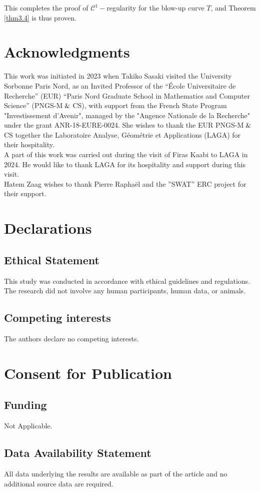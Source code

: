 \documentclass[
  sn-mathphys-num,
  colorlinks,
  linkcolor=darkmagenta,
  citecolor=rufous,
  urlcolor=zaffre,
  hypertexnames=false
]{sn-jnl}
\numberwithin{equation}{section}
\begin{document}
This completes the proof of $\mathcal{C}^1-$regularity for the blow-up curve $T$, and Theorem \ref{thm3.4} is thus proven.
\section*{Acknowledgments}
 This work was initiated in 2023 when Takiko Sasaki visited the University Sorbonne Paris Nord, as an Invited Professor of the ``\'Ecole Universitaire de Recherche'' (EUR) ``Paris Nord Graduate School in Mathematics and Computer Science'' (PNGS-M$\And$CS), with support from the French State Program "Investissement d’Avenir", managed by the "Angence Nationale de la Recherche" under the grant ANR-18-EURE-0024. She wishes to thank the EUR PNGS-M$\And$CS together the Laboratoire Analyse, Géométrie et Applications (LAGA) for their hospitality.\\
A part of this work was carried out during the visit of Firas Kaabi to LAGA in 2024. He would like to thank LAGA for its hospitality and support during this visit.\\
Hatem Zaag wishes to thank Pierre Raphaël and
the ”SWAT” ERC project for their support.

\section*{Declarations}
\subsection*{Ethical Statement}
This study was conducted in accordance with ethical guidelines and regulations. The research did not involve any human participants, human data, or animals. 
\subsection*{Competing interests} The authors declare no competing interests.
\section*{Consent for Publication}
\subsection*{Funding} Not Applicable.
\subsection*{Data Availability Statement}
All data underlying the results are available as part of the article and no additional source data are required.
\end{document}
